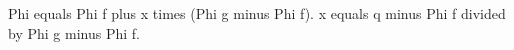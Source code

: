 Phi equals Phi f plus x times (Phi g minus Phi f). x equals q minus Phi f divided by Phi g minus Phi f.